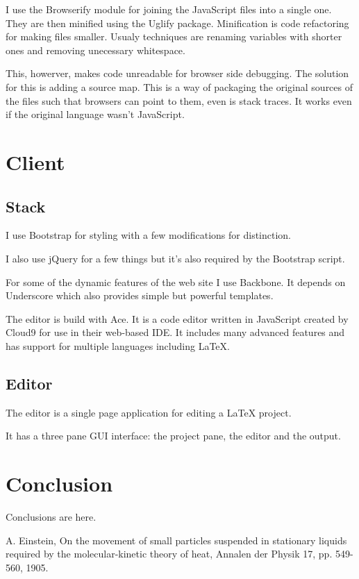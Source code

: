\documentclass{llncs}
\begin{document}
I use the Browserify module for joining the JavaScript files into a single one. They are then minified using the Uglify package. Minification is code refactoring for making files smaller. Usualy techniques are renaming variables with shorter ones and removing unecessary whitespace.

This, howerver, makes code unreadable for browser side debugging. The solution for this is adding a source map. This is a way of packaging the original sources of the files such that browsers can point to them, even is stack traces. It works even if the original language wasn't JavaScript.

\section{Client}

\subsection{Stack}

I use Bootstrap for styling with a few modifications for distinction.

I also use jQuery for a few things but it's also required by the Bootstrap script.

For some of the dynamic features of the web site I use Backbone. It depends on Underscore which also provides simple but powerful templates.

The editor is build with Ace. It is a code editor written in JavaScript created by Cloud9 for use in their web-based IDE. It includes many advanced features and has support for multiple languages including \LaTeX{}.

\subsection{Editor}

The editor is a single page application for editing a \LaTeX{} project.

It has a three pane GUI interface: the project pane, the editor and the output.

\section{Conclusion}

Conclusions are here.

\begin{thebibliography}{1}

A. Einstein, On the movement of small particles suspended in stationary liquids required by the molecular-kinetic theory of heat, Annalen der Physik 17, pp. 549-560, 1905.

\end{thebibliography}
\end{document}
